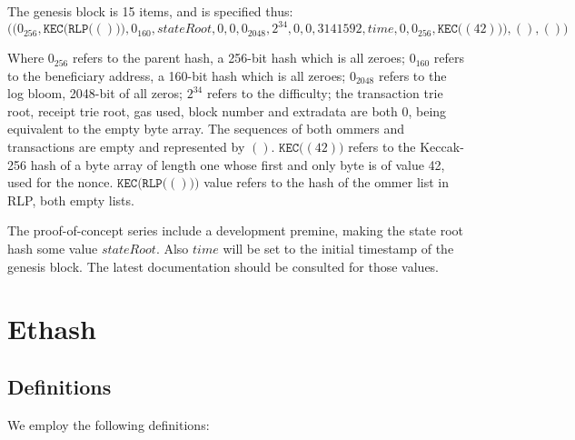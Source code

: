 \documentclass[9pt,oneside]{amsart}
\begin{document}
The genesis block is 15 items, and is specified thus:
\begin{equation}
\big( \big( 0_{256}, \mathtt{KEC}\big(\mathtt{RLP}\big( () \big)\big), 0_{160}, stateRoot, 0, 0, 0_{2048}, 2^{34}, 0, 0, 3141592, time, 0, 0_{256},  \mathtt{KEC}\big( (42) \big) \big), (), () \big)
\end{equation}

Where $0_{256}$ refers to the parent hash, a 256-bit hash which is all zeroes; $0_{160}$ refers to the beneficiary address, a 160-bit hash which is all zeroes; $0_{2048}$ refers to the log bloom, 2048-bit of all zeros; $2^{34}$ refers to the difficulty; the transaction trie root, receipt trie root, gas used, block number and extradata are both $0$, being equivalent to the empty byte array. The sequences of both ommers and transactions are empty and represented by $()$. $\mathtt{KEC}\big( (42) \big)$ refers to the Keccak-256 hash of a byte array of length one whose first and only byte is of value 42, used for the nonce. $\mathtt{KEC}\big(\mathtt{RLP}\big( () \big)\big)$ value refers to the hash of the ommer list in RLP, both empty lists.

The proof-of-concept series include a development premine, making the state root hash some value $stateRoot$. Also $time$ will be set to the initial timestamp of the genesis block. The latest documentation should be consulted for those values.

\section{Ethash}\label{app:ethash}
\subsection{Definitions}
We employ the following definitions:
\end{document}
